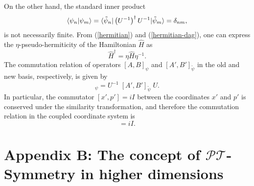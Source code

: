 \documentclass[a4paper, 12pt]{article}
\begin{document}
On the other hand, the standard inner product
\begin{equation}
    \braket{\psi_n|\psi_m}=\braket{\tilde{\psi}_n|\left(U^{-1}\right)^{\dagger}U^{-1}|\tilde{\psi}_m}=\delta_{nm},
\end{equation}
is not necessarily finite. From (\ref{hermitian}) and (\ref{hermitian-dag}), one can express the \( \eta \)-pseudo-hermiticity of the Hamiltonian \( \hat{H} \) as 
\begin{equation}\label{eta}
    \hat{H}^{\dagger}=\eta\hat{H}\eta^{-1}.
\end{equation}
The commutation relation of operators \( [A,B]_{\psi} \) and \( [A',B']_{\tilde{\psi}} \) in the old and new basis, respectively, is given by
\begin{equation}
    [A,B]_{\psi}=U^{-1}\;[A',B']_{\tilde{\psi}}\;U.  
\end{equation}
In particular, the commutator \([x',p']=i I\) between the coordinates \( x' \) and \( p' \) is conserved under the similarity transformation, and therefore the commutation relation in the coupled coordinate system is
\begin{equation}
    [x,p]=i I.
\end{equation}


\renewcommand{\theequation}{B.\arabic{equation}} 
\setcounter{equation}{0} %


\section*{Appendix B: The concept of \( \mathcal{PT} \)-Symmetry in higher dimensions}
\end{document}
